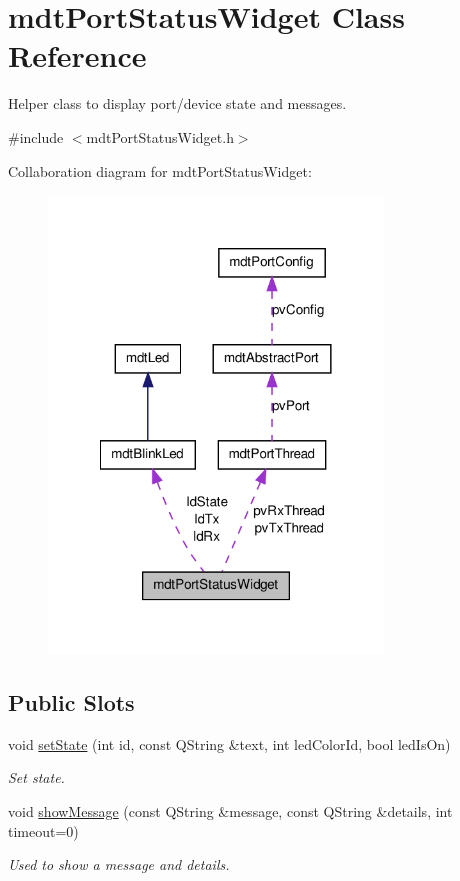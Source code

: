 \hypertarget{classmdt_port_status_widget}{
\section{mdtPortStatusWidget Class Reference}
\label{classmdt_port_status_widget}
}


Helper class to display port/device state and messages.  




{\ttfamily \#include $<$mdtPortStatusWidget.h$>$}



Collaboration diagram for mdtPortStatusWidget:\nopagebreak
\begin{figure}[H]
\begin{center}
\leavevmode
\includegraphics[width=252pt]{classmdt_port_status_widget__coll__graph}
\end{center}
\end{figure}
\subsection*{Public Slots}
\begin{DoxyCompactItemize}
\item 
void \hyperlink{classmdt_port_status_widget_a489b587cd7be7dd6ae6f2782565553bf}{setState} (int id, const QString \&text, int ledColorId, bool ledIsOn)
\begin{DoxyCompactList}\small\item\em Set state. \end{DoxyCompactList}\item 
void \hyperlink{classmdt_port_status_widget_a8fce28ddb290512f5681cf800ac17b81}{showMessage} (const QString \&message, const QString \&details, int timeout=0)
\begin{DoxyCompactList}\small\item\em Used to show a message and details. \end{DoxyCompactList}\end{DoxyCompactItemize}
